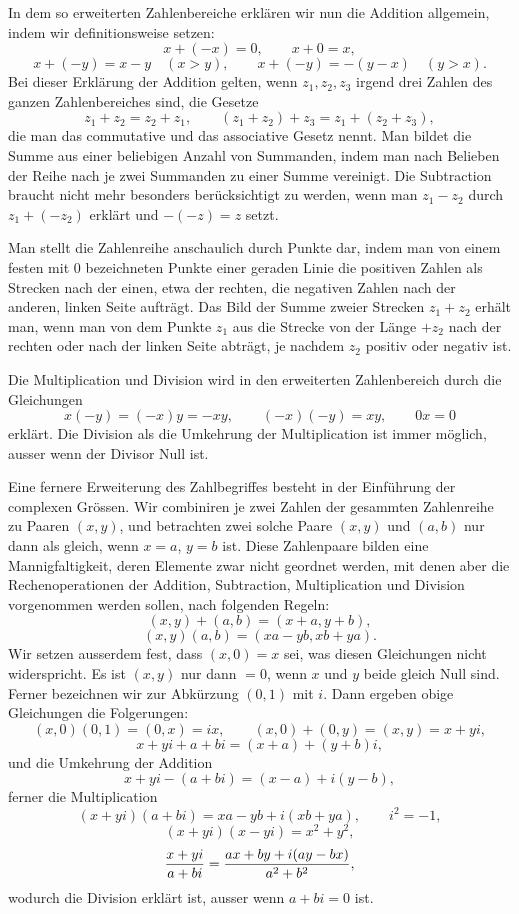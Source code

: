 \documentclass[11pt]{article}
\begin{document}
In dem so erweiterten Zahlenbereiche erklären wir nun die Addition allgemein, indem wir definitionsweise setzen:
\[
 x+(-x)=0,
 \qquad x+0=x,
\]
\[
 x+(-y)=x-y \quad (x>y),
 \qquad
 x+(-y)=-(y-x) \quad (y>x).
\]
Bei dieser Erklärung der Addition gelten, wenn $z_1,z_2,z_3$ irgend drei Zahlen des ganzen Zahlenbereiches sind, die Gesetze
\[
 z_1+z_2=z_2+z_1,
 \qquad (z_1+z_2)+z_3=z_1+(z_2+z_3),
\]
die man das commutative und das associative Gesetz nennt. Man bildet die Summe aus einer beliebigen Anzahl von Summanden, indem man nach Belieben der Reihe nach je zwei Summanden zu einer Summe vereinigt. Die Subtraction braucht nicht mehr besonders berücksichtigt zu werden, wenn man $z_1-z_2$ durch $z_1+(-z_2)$ erklärt und $-(-z)=z$ setzt.

Man stellt die Zahlenreihe anschaulich durch Punkte dar, indem man von einem festen mit $0$ bezeichneten Punkte einer geraden Linie die positiven Zahlen als Strecken nach der einen, etwa der rechten, die negativen Zahlen nach der anderen, linken Seite aufträgt. Das Bild der Summe zweier Strecken $z_1+z_2$ erhält man, wenn man von dem Punkte $z_1$ aus die Strecke von der Länge $+z_2$ nach der rechten oder nach der linken Seite abträgt, je nachdem $z_2$ positiv oder negativ ist.

Die Multiplication und Division wird in den erweiterten Zahlenbereich durch die Gleichungen
\[
 x(-y)=(-x)y=-xy,
 \qquad (-x)(-y)=xy,
 \qquad 0x=0
\]
erklärt. Die Division als die Umkehrung der Multiplication ist immer möglich, ausser wenn der Divisor Null ist.

Eine fernere Erweiterung des Zahlbegriffes besteht in der Einführung der complexen Grössen. Wir combiniren je zwei Zahlen der gesammten Zahlenreihe zu Paaren $(x,y)$, und betrachten zwei solche Paare $(x,y)$ und $(a,b)$ nur dann als gleich, wenn $x=a$, $y=b$ ist. Diese Zahlenpaare bilden eine Mannigfaltigkeit, deren Elemente zwar nicht geordnet werden, mit denen aber die Rechenoperationen der Addition, Subtraction, Multiplication und Division vorgenommen werden sollen, nach folgenden Regeln:
\[
 (x,y)+(a,b)=(x+a,y+b),
\]
\[
 (x,y)(a,b)=(xa-yb,xb+ya).
\]
Wir setzen ausserdem fest, dass $(x,0)=x$ sei, was diesen Gleichungen nicht widerspricht. Es ist $(x,y)$ nur dann $=0$, wenn $x$ und $y$ beide gleich Null sind. Ferner bezeichnen wir zur Abkürzung $(0,1)$ mit $i$. Dann ergeben obige Gleichungen die Folgerungen:
\[
 (x,0)(0,1)=(0,x)=ix,
 \qquad
 (x,0)+(0,y)=(x,y)=x+yi,
\]
\[
 x+yi+a+bi=(x+a)+(y+b)i,
\]
und die Umkehrung der Addition
\[
 x+yi-(a+bi)=(x-a)+i(y-b),
\]
ferner die Multiplication
\[
 (x+yi)(a+bi)=xa-yb+i(xb+ya),
 \qquad i^2=-1,
\]
\[
 (x+yi)(x-yi)=x^2+y^2,
\]
\[
 {x+yi\over a+bi}={ax+by+i(ay-bx)\over a^2+b^2},
\]
wodurch die Division erklärt ist, ausser wenn $a+bi=0$ ist.
\end{document}
